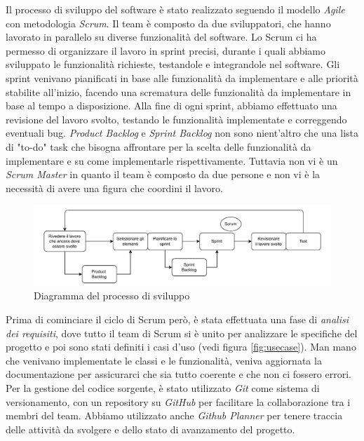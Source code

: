\documentclass[a4paper]{article}
\begin{document}
Il processo di sviluppo del software è stato realizzato seguendo il modello \textit{Agile} con metodologia \textit{Scrum}.
Il team è composto da due sviluppatori, che hanno lavorato in parallelo su diverse funzionalità del software.
Lo Scrum ci ha permesso di organizzare il lavoro in sprint precisi, durante i quali abbiamo
sviluppato le funzionalità richieste, testandole e integrandole nel software. 
Gli sprint venivano pianificati in base alle funzionalità da implementare e alle priorità stabilite all'inizio,
facendo una scrematura delle funzionalità da implementare in base al tempo a disposizione. 
Alla fine di ogni sprint, abbiamo effettuato una revisione del lavoro svolto, testando le funzionalità implementate e correggendo eventuali bug.
\textit{Product Backlog} e \textit{Sprint Backlog} non sono nient'altro che una lista di "to-do" task che bisogna affrontare per la scelta delle funzionalità da implementare
e su come implementarle rispettivamente. Tuttavia non vi è un \textit{Scrum Master} in quanto il team è composto da due persone e non vi è la necessità di avere una figura che coordini il lavoro.
\begin{figure}[H]
  \begin{center}
    \includegraphics[width=1\textwidth]{adProcessodiSviluppo.pdf}
  \end{center}
  \caption{Diagramma del processo di sviluppo}
  \label{fig:adProcessodiSviluppo}
\end{figure}
\noindent
Prima di cominciare il ciclo di Scrum però, è stata effettuata una fase di \textit{analisi dei requisiti}, dove tutto il team di Scrum si è unito per 
analizzare le specifiche del progetto e poi sono stati definiti i casi d'uso (vedi figura \ref{fig:usecase}).
Man mano che venivano implementate le classi e le funzionalità, veniva aggiornata la documentazione per assicurarci che sia tutto coerente e che non ci fossero errori.
Per la gestione del codice sorgente, è stato utilizzato \textit{Git} come sistema di versionamento, con un repository su \textit{GitHub} per facilitare la collaborazione tra i membri del team.
Abbiamo utilizzato anche \textit{Github Planner} per tenere traccia delle attività da svolgere e dello stato di avanzamento del progetto.
\end{document}
